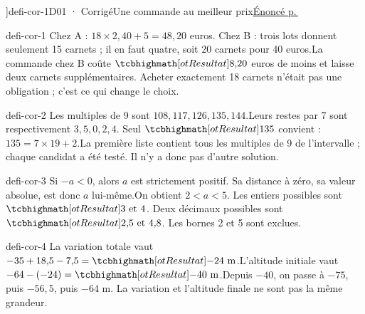 \editionPage[\pdfbookmark[0]{Corrigés des défis}{bm-defi-cor-1-parent}]{defi-cor-1}{D01 · Corrigé}{Une commande au meilleur prix}{\hyperref[defi-ex-1]{Énoncé p.\,\pageref*{defi-ex-1}}}
\begin{blocEdition}{defi-cor-1}
Chez A : $18\times2{,}40+5=48{,}20$ euros. Chez B : trois lots donnent seulement 15 carnets ; il en faut quatre, soit 20 carnets pour 40 euros.La commande chez B coûte $\res{8{,}20}$ euros de moins et laisse deux carnets supplémentaires. Acheter exactement 18 carnets n’était pas une obligation ; c’est ce qui change le choix.
\end{blocEdition}
\begin{blocEdition}{defi-cor-2}
Les multiples de 9 sont $108,117,126,135,144$.Leurs restes par 7 sont respectivement $3,5,0,2,4$. Seul $\res{135}$ convient : $135=7\times19+2$.La première liste contient tous les multiples de 9 de l’intervalle ; chaque candidat a été testé. Il n’y a donc pas d’autre solution.
\end{blocEdition}
\begin{blocEdition}{defi-cor-3}
Si $-a<0$, alors $a$ est strictement positif. Sa distance à zéro, sa valeur absolue, est donc $a$ lui-même.On obtient $2<a<5$. Les entiers possibles sont $\res{3\text{ et }4}$. Deux décimaux possibles sont $\res{2{,}5\text{ et }4{,}8}$. Les bornes 2 et 5 sont exclues.
\end{blocEdition}
\begin{blocEdition}{defi-cor-4}
La variation totale vaut $-35+18{,}5-7{,}5=\res{-24\ \mathrm m}$.L’altitude initiale vaut $-64-(-24)=\res{-40\ \mathrm m}$.Depuis $-40$, on passe à $-75$, puis $-56{,}5$, puis $-64$ m. La variation et l’altitude finale ne sont pas la même grandeur.
\end{blocEdition}
